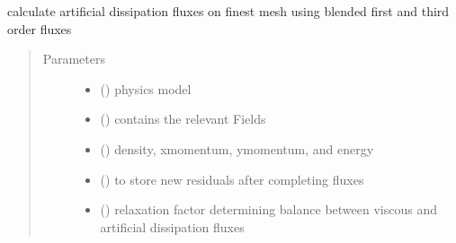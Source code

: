 \documentclass[letterpaper,10pt,english]{sphinxmanual}
\begin{document}
\begin{fulllineitems}
\label{\detokenize{autoapi/dflux/index:dflux.dflux}}
\sphinxAtStartPar
calculate artificial dissipation fluxes on finest mesh using blended first and
third order fluxes
\begin{quote}\begin{description}
\item[{Parameters}] \leavevmode\begin{itemize}
\item {} 
\sphinxAtStartPar
{} ({\hyperref[\detokenize{autoapi/NavierStokes/index:NavierStokes.NavierStokes}]{}}) \textendash{} physics model

\item {} 
\sphinxAtStartPar
{} ({\hyperref[\detokenize{autoapi/Workspace/index:Workspace.Workspace}]{}}) \textendash{} contains the relevant Fields

\item {} 
\sphinxAtStartPar
{} ({\hyperref[\detokenize{autoapi/Field/index:Field.Field}]{}}) \textendash{} density, x\sphinxhyphen{}momentum, y\sphinxhyphen{}momentum, and energy

\item {} 
\sphinxAtStartPar
{} ({\hyperref[\detokenize{autoapi/Field/index:Field.Field}]{}}) \textendash{} to store new residuals after completing fluxes

\item {} 
\sphinxAtStartPar
{} () \textendash{} relaxation factor determining balance between viscous and artificial dissipation fluxes

\end{itemize}

\end{description}\end{quote}

\end{fulllineitems}
\end{document}
